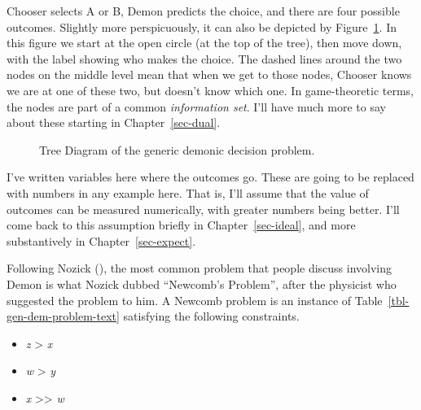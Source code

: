 \documentclass[
  12pt,
  letterpaper,
  DIV=11,
  numbers=noendperiod]{scrreprt}
\providecommand{\tightlist}{%
  \setlength{\itemsep}{0pt}\setlength{\parskip}{0pt}}\usepackage{longtable,booktabs,array}
\begin{document}
Chooser selects A or B, Demon predicts the choice, and there are four
possible outcomes. Slightly more perspicuously, it can also be depicted
by Figure~\ref{fig-gen-dem-problem-text}. In this figure we start at the
open circle (at the top of the tree), then move down, with the label
showing who makes the choice. The dashed lines around the two nodes on
the middle level mean that when we get to those nodes, Chooser knows we
are at one of these two, but doesn't know which one. In game-theoretic
terms, the nodes are part of a common \emph{information set}. I'll have
much more to say about these starting in Chapter~\ref{sec-dual}.

\begin{figure}


\caption{\label{fig-gen-dem-problem-text}Tree Diagram of the generic
demonic decision problem.}

\end{figure}%

I've written variables here where the outcomes go. These are going to be
replaced with numbers in any example here. That is, I'll assume that the
value of outcomes can be measured numerically, with greater numbers
being better. I'll come back to this assumption briefly in
Chapter~\ref{sec-ideal}, and more substantively in
Chapter~\ref{sec-expect}.

Following Nozick (), the most common
problem that people discuss involving Demon is what Nozick dubbed
``Newcomb's Problem'', after the physicist who suggested the problem to
him. A Newcomb problem is an instance of
Table~\ref{tbl-gen-dem-problem-text} satisfying the following
constraints.

\begin{itemize}
\tightlist
\item
  \emph{z} \textgreater{} \emph{x}
\item
  \emph{w} \textgreater{} \emph{y}
\item
  \emph{x} \textgreater\textgreater{} \emph{w}
\end{itemize}
\end{document}

